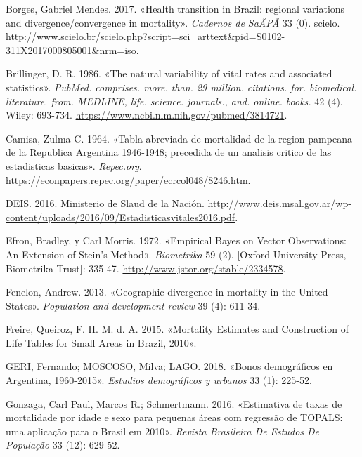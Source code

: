 \documentclass[12pt,spanish,]{article}
\begin{document}
\leavevmode\hypertarget{ref-Borges2017}{}%
Borges, Gabriel Mendes. 2017. «Health transition in Brazil: regional
variations and divergence/convergence in mortality». \emph{Cadernos de
SaÃPÃ} 33 (0). scielo.
\url{http://www.scielo.br/scielo.php?script=sci_arttext\&pid=S0102-311X2017000805001\&nrm=iso}.

\leavevmode\hypertarget{ref-Brillinger1986}{}%
Brillinger, D. R. 1986. «The natural variability of vital rates and
associated statistics». \emph{PubMed. comprises. more. than. 29 million.
citations. for. biomedical. literature. from. MEDLINE, life. science.
journals., and. online. books.} 42 (4). Wiley: 693-734.
\url{https://www.ncbi.nlm.nih.gov/pubmed/3814721}.

\leavevmode\hypertarget{ref-Camisa1964}{}%
Camisa, Zulma C. 1964. «Tabla abreviada de mortalidad de la region
pampeana de la Republica Argentina 1946-1948; precedida de un analisis
critico de las estadisticas basicas». \emph{Repec.org}.
\url{https://econpapers.repec.org/paper/ecrcol048/8246.htm}.

\leavevmode\hypertarget{ref-DEIS2016}{}%
DEIS. 2016. Ministerio de Slaud de la Nación.
\url{http://www.deis.msal.gov.ar/wp-content/uploads/2016/09/Estadisticasvitales2016.pdf}.

\leavevmode\hypertarget{ref-Efron1972}{}%
Efron, Bradley, y Carl Morris. 1972. «Empirical Bayes on Vector
Observations: An Extension of Stein's Method». \emph{Biometrika} 59 (2).
{[}Oxford University Press, Biometrika Trust{]}: 335-47.
\url{http://www.jstor.org/stable/2334578}.

\leavevmode\hypertarget{ref-Fenelon2013}{}%
Fenelon, Andrew. 2013. «Geographic divergence in mortality in the United
States». \emph{Population and development review} 39 (4): 611-34.

\leavevmode\hypertarget{ref-FreireEtAl2015}{}%
Freire, Queiroz, F. H. M. d. A. 2015. «Mortality Estimates and
Construction of Life Tables for Small Areas in Brazil, 2010».

\leavevmode\hypertarget{ref-GeriMoscoso2018}{}%
GERI, Fernando; MOSCOSO, Milva; LAGO. 2018. «Bonos demográficos en
Argentina, 1960-2015». \emph{Estudios demográficos y urbanos} 33 (1):
225-52.

\leavevmode\hypertarget{ref-GonzagaSchmertmann2016}{}%
Gonzaga, Carl Paul, Marcos R.; Schmertmann. 2016. «Estimativa de taxas
de mortalidade por idade e sexo para pequenas áreas com regressão de
TOPALS: uma aplicação para o Brasil em 2010». \emph{Revista Brasileira
De Estudos De População} 33 (12): 629-52.
\end{document}
